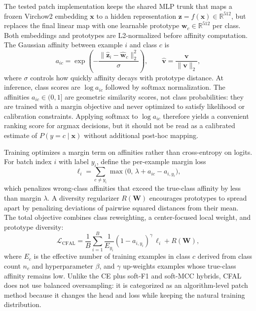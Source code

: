 \documentclass[11pt]{article}
\begin{document}
The tested patch implementation keeps the shared MLP trunk that maps a frozen Virchow2 embedding $\mathbf{x}$ to a hidden representation $\mathbf{z}=f(\mathbf{x})\in\mathbb{R}^{512}$, but replaces the final linear map with one learnable prototype $\mathbf{w}_c\in\mathbb{R}^{512}$ per class. Both embeddings and prototypes are L2-normalized before affinity computation. The Gaussian affinity between example $i$ and class $c$ is
\begin{equation}
  a_{ic}=\exp\!\left(-\frac{\|\hat{\mathbf{z}}_i-\hat{\mathbf{w}}_c\|_2^2}{\sigma}\right),
  \qquad
  \hat{\mathbf{v}}=\frac{\mathbf{v}}{\|\mathbf{v}\|_2},
  \label{eq:cfal-affinity}
\end{equation}
\noindent where $\sigma$ controls how quickly affinity decays with prototype distance. At inference, class scores are $\log a_{ic}$ followed by softmax normalization. The affinities $a_{ic}\in(0,1]$ are geometric similarity scores, not class probabilities: they are trained with a margin objective and never optimized to satisfy likelihood or calibration constraints. Applying softmax to $\log a_{ic}$ therefore yields a convenient ranking score for argmax decisions, but it should not be read as a calibrated estimate of $P(y=c\mid \mathbf{x})$ without additional post-hoc mapping.

Training optimizes a margin term on affinities rather than cross-entropy on logits. For batch index $i$ with label $y_i$, define the per-example margin loss
\begin{equation}
  \ell_i=\sum_{c\ne y_i}\max\bigl(0,\, \lambda + a_{ic}-a_{i,y_i}\bigr),
  \label{eq:cfal-margin}
\end{equation}
\noindent which penalizes wrong-class affinities that exceed the true-class affinity by less than margin $\lambda$. A diversity regularizer $R(\mathbf{W})$ encourages prototypes to spread apart by penalizing deviations of pairwise squared distances from their mean. The total objective combines class reweighting, a center-focused local weight, and prototype diversity:
\begin{equation}
  \mathcal{L}_{\mathrm{CFAL}}=
  \frac{1}{B}\sum_{i=1}^{B}
  \frac{1}{E_{y_i}}
  (1-a_{i,y_i})^{\gamma}\,\ell_i
  + R(\mathbf{W}),
  \label{eq:cfal-total}
\end{equation}
\noindent where $E_c$ is the effective number of training examples in class $c$ derived from class count $n_c$ and hyperparameter $\beta$, and $\gamma$ up-weights examples whose true-class affinity remains low. Unlike the CE plus soft-F1 and soft-MCC hybrids, CFAL does not use balanced oversampling: it is categorized as an algorithm-level patch method because it changes the head and loss while keeping the natural training distribution.
\end{document}
